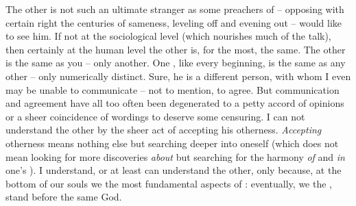 The other is not such an ultimate stranger as some preachers of 
-- opposing with certain right the centuries of sameness, leveling off and
evening out -- would like to see him. If not at the sociological level (which
nourishes much of the  talk), then certainly at the human level
the other is, for the most, the same. The other is the same as you -- only
another. One , like every  beginning, is 
the same as any other -- only numerically distinct. Sure, he is a different
person, with whom I even may be unable to communicate -- not to mention, to
agree. But communication and agreement have all too often been degenerated to a
petty accord of opinions or a sheer coincidence of wordings to deserve some
censuring. I can not understand the other by the sheer act of accepting his
otherness. {\em Accepting} otherness means nothing else but searching deeper
into oneself (which does not mean looking for more discoveries {\em about}
 but searching for the harmony {\em of} and {\em in} one's
). I understand, or at least can understand the other, only because, at
the bottom of our souls we  the most
fundamental aspects of : eventually, we  the
, stand before the same God.




